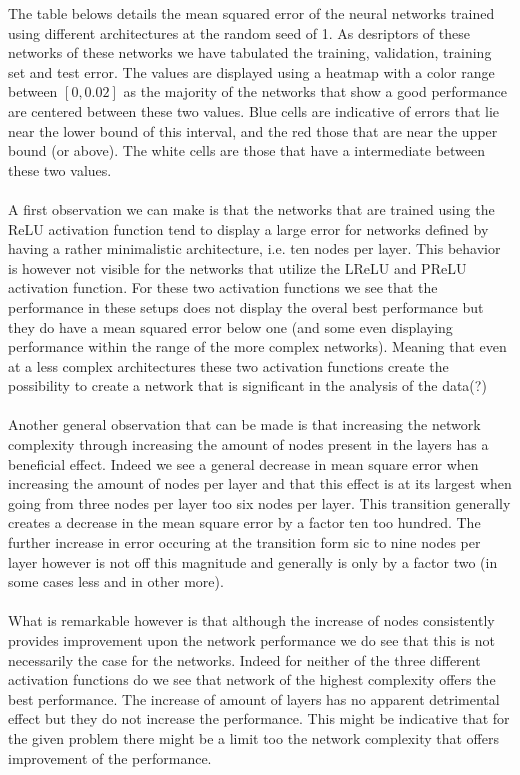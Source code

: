 \documentclass[]{article}
\begin{document}
The table belows details the mean squared error of the neural networks trained using different architectures at the random seed of 1. As desriptors of these networks of these networks we have tabulated the training, validation, training set and test error. The values are displayed using a heatmap with a color range between $[0, 0.02]$ as the majority of the networks that show a good performance are centered between these two values. Blue cells are indicative of errors that lie near the lower bound of this interval, and the red those that are near the upper bound (or above). The white cells are those that have a intermediate between these two values.
\\
\\
A first observation we can make is that the networks that are trained using the ReLU activation function tend to display a large error for networks defined by having a rather minimalistic architecture, i.e. ten nodes per layer. This behavior is however not visible for the networks that utilize the LReLU and PReLU activation function. For these two activation functions we see that the performance in these setups does not display the overal best performance but they do have a mean squared error below one (and some even displaying performance within the range of the more complex networks). Meaning that even at a less complex architectures these two activation functions create the possibility to create a network that is significant in the analysis of the data(?)
\\
\\
Another general observation that can be made is that increasing the network complexity through increasing the amount of nodes present in the layers has a beneficial effect. Indeed we see a general decrease in mean square error when increasing the amount of nodes per layer and that this effect is at its largest when going from three nodes per layer too six nodes per layer. This transition generally creates a decrease in the mean square error by a factor ten too hundred. The further increase in error occuring at the transition form sic to nine nodes per layer however is not off this magnitude and generally is only by a factor two (in some cases less and in other more).
\\
\\
What is remarkable however is that although the increase of nodes consistently provides improvement upon the network performance we do see that this is not necessarily the case for the networks. Indeed for neither of the three different activation functions do we see that network of the highest complexity offers the best performance. The increase of amount of layers has no apparent detrimental effect but they do not increase the performance. This might be indicative that for the given problem there might be a limit too the network complexity that offers improvement of the performance. 
\end{document}

